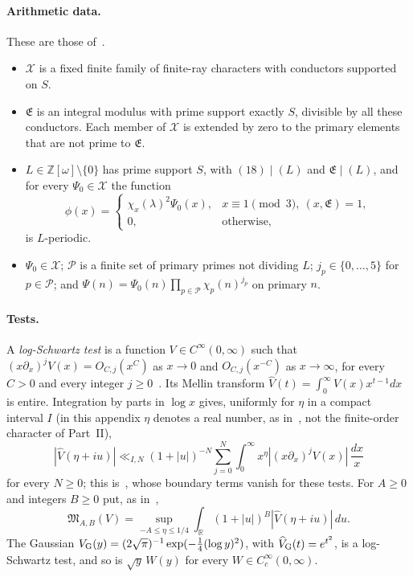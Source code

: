 \documentclass[11pt]{article}
\numberwithin{equation}{section}
\newcommand{\OO}{\mathbb Z[\omega]}
\begin{document}
\paragraph{Arithmetic data.} These are those of~\cite[Proposition~5.1]{OAI78}.
\begin{itemize}
\item $\mathcal X$ is a fixed finite family of finite-ray characters with conductors supported on $S$.
\item $\mathfrak E$ is an integral modulus with prime support exactly $S$, divisible by all these conductors.
 Each member of $\mathcal X$ is extended by zero to the primary elements that are not prime to $\mathfrak E$.
\item $L\in\OO\setminus\{0\}$ has prime support $S$, with $(18)\mid(L)$ and $\mathfrak E\mid(L)$, and for every
 $\Psi_0\in\mathcal X$ the function
 \begin{equation}\label{eq:d122}
  \phi(x)=\begin{cases}\chi_x(\lambda)^2\Psi_0(x),&x\equiv1\pmod3,\ (x,\mathfrak E)=1,\\0,&\text{otherwise},\end{cases}
 \end{equation}
 is $L$-periodic.
\item $\Psi_0\in\mathcal X$; $\mathcal P$ is a finite set of primary primes not dividing $L$; $j_p\in\{0,\dots,5\}$
 for $p\in\mathcal P$; and $\Psi(n)=\Psi_0(n)\prod_{p\in\mathcal P}\chi_p(n)^{j_p}$ on primary $n$.
\end{itemize}

\paragraph{Tests.} A \emph{log-Schwartz test} is a function $V\in C^\infty(0,\infty)$ such that
$(x\partial_x)^jV(x)=O_{C,j}(x^C)$ as $x\to0$ and $O_{C,j}(x^{-C})$ as $x\to\infty$, for every $C>0$ and every
integer $j\ge0$~\cite[Proposition~5.1]{OAI78}. Its Mellin transform $\widehat V(t)=\int_0^\infty V(x)x^{t-1}dx$ is
entire. Integration by parts in $\log x$ gives, uniformly for $\eta$ in a compact interval $I$ (in this appendix
$\eta$ denotes a real number, as in~\cite{OAI78}, not the finite-order character of Part~II),
\begin{equation}\label{eq:s1-mellin-tail}
 |\widehat V(\eta+iu)|\ll_{I,N}(1+|u|)^{-N}\sum_{j=0}^N\int_0^\infty x^\eta|(x\partial_x)^jV(x)|\,\frac{dx}x
\end{equation}
for every $N\ge0$; this is~\cite[eq.~(4.11)]{OAI78}, whose boundary terms vanish for these tests.
For $A\ge0$ and integers $B\ge0$ put, as in~\cite[Proposition~5.1]{OAI78},
\begin{equation}\label{eq:d123}
 \mathfrak M_{A,B}(V)=\sup_{-A\le\eta\le1/4}\int_{\mathbb R}(1+|u|)^B|\widehat V(\eta+iu)|\,du .
\end{equation}
The Gaussian $V_{\rm G}(y)=(2\sqrt\pi)^{-1}\exp(-\frac14(\log y)^2)$, with $\widehat V_{\rm G}(t)=e^{t^2}$, is a
log-Schwartz test, and so is $\sqrt y\,W(y)$ for every $W\in C_c^\infty(0,\infty)$.
\end{document}
